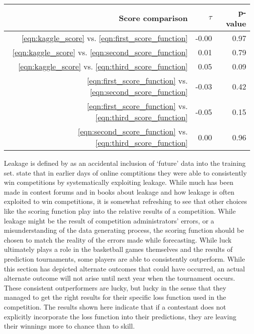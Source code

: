 \begin{table}[ht]
\centering
\begin{tabular}{rrr}
  \hline
Score comparison & $\tau$ & p-value \\ 
  \hline
\ref{eqn:kaggle_score} vs. \ref{eqn:first_score_function} & -0.00 & 0.97 \\ 
\ref{eqn:kaggle_score} vs. \ref{eqn:second_score_function} & 0.01 & 0.79 \\ 
\ref{eqn:kaggle_score} vs. \ref{eqn:third_score_function} & 0.05 & 0.09 \\ 
\ref{eqn:first_score_function} vs. \ref{eqn:second_score_function} & -0.03 & 0.42 \\ 
\ref{eqn:first_score_function} vs. \ref{eqn:third_score_function}   & -0.05 & 0.15 \\ 
\ref{eqn:second_score_function} vs. \ref{eqn:third_score_function}  & 0.00 & 0.96 \\ 
   \hline
\end{tabular}
\label{tab:kendall_tau_table}
\caption{}
\end{table}



Leakage is defined by \cite{schutt2013doing} as an accidental inclusion of `future' data into the training set. \cite{schutt2013doing} state that in earlier days of online comptitions they were able to consistently win competitions by systematically exploiting leakage. While much has been made in contest forums and in books  about leakage and how leakage is often exploited to win competitions, it is somewhat refreshing to see that other choices like the scoring function play into the relative results of a competition. While leakage might be the result of competition administrators' errors, or a misunderstanding of the data generating process, the scoring function should be chosen to match the reality of the errors made while forecasting. While luck ultimately plays a role in the basketball games themselves and the results of prediction tournaments, some players are able to consistently outperform. While this section has depicted alternate outcomes that could have occurred, an actual alternate outcome will not arise until next year when the tournament occurs.  These consistent outperformers are lucky, but lucky in the sense that they managed to get the right results for their specific loss function used in the competition. The results shown here indicate that if a contestant does not explicitly incorporate the loss function into their predictions, they are leaving their winnings more to chance than to skill. 